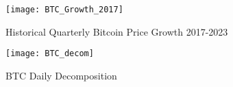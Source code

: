 \documentclass{beamer}
\begin{document}
	\begin{frame}
	\begin{figure}
			\texttt{[image: BTC\_Growth\_2017]}
			\caption{Historical Quarterly Bitcoin Price Growth 2017-2023}
			\label{fig:BTCpart1}
		\end{figure}
	\end{frame}
	\begin{frame}
	\begin{figure}
			\texttt{[image: BTC\_decom]}
			\caption{BTC Daily Decomposition}
			\label{fig:BTCdecomp}
		\end{figure}
	\end{frame}
       
\end{document}
